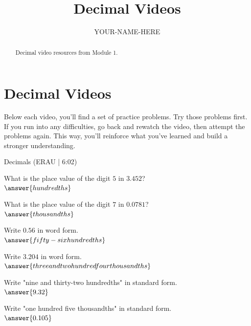 \documentclass{ximera}
\title{Decimal Videos}
\author{YOUR-NAME-HERE}
\begin{document}
\begin{abstract}
Decimal video resources from Module 1.
\end{abstract}
\maketitle

\section*{Decimal Videos}

Below each video, you’ll find a set of practice problems. Try those problems first. If you run into any difficulties, go back and rewatch the video, then attempt the problems again. This way, you’ll reinforce what you’ve learned and build a stronger understanding.

Decimals (ERAU | 6:02)



\begin{problem}
What is the place value of the digit $5$ in $3.452$?\\
$\answer{hundredths}$
\end{problem}

\begin{problem}
What is the place value of the digit $7$ in $0.0781$?\\
$\answer{thousandths}$
\end{problem}

\begin{problem}
Write $0.56$ in word form.\\
$\answer{fifty-six hundredths}$
\end{problem}

\begin{problem}
Write $3.204$ in word form.\\
$\answer{three and two hundred four thousandths}$
\end{problem}

\begin{problem}
Write "nine and thirty-two hundredths" in standard form.\\
$\answer{9.32}$
\end{problem}

\begin{problem}
Write "one hundred five thousandths" in standard form.\\
$\answer{0.105}$
\end{problem}
\end{document}
